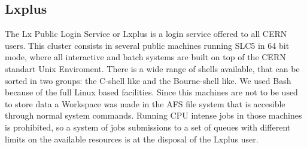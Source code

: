 \subsection{Lxplus}
\label{lxplus}
The Lx Public Login Service or Lxplus is a login service offered to all CERN users. This cluster consists in several public machines running SLC5 in 64 bit mode, where all interactive and batch systems are built on top of the CERN standart Unix Enviroment. There is a wide range of shells available, that can be sorted in two groups: the C-shell like and the Bourne-shell like. We used Bash because of the full Linux based facilities. Since this machines are not to be used to store data a Workspace was made in the AFS file system that is accesible through normal system commands. Running CPU intense jobs in those machines is prohibited, so a system of jobs submissions to a set of queues with different limits on the available resources is at the disposal of the Lxplus user.
